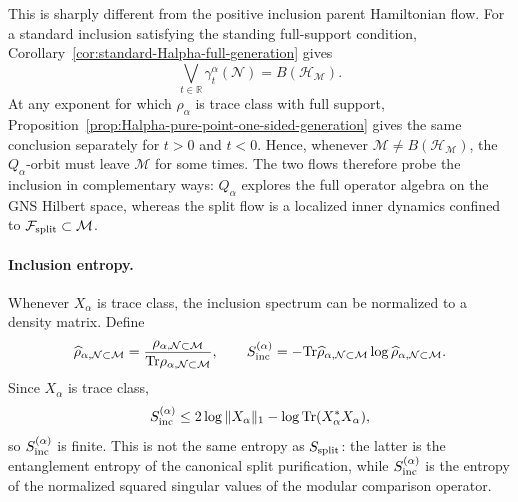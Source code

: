 \documentclass[a4paper,11pt]{article}
\theoremstyle{definition}
\newcommand{\Tr}{\text{Tr}}
\newcommand{\mN}{\mathcal{N}}
\newcommand{\mH}{\mathcal{H}}
\newcommand{\mM}{\mathcal{M}}
\begin{document}
This is sharply different from the positive inclusion parent Hamiltonian flow. For
a standard inclusion satisfying the standing full-support condition, Corollary~\ref{cor:standard-Halpha-full-generation}
gives
\begin{equation}
    \bigvee_{t\in\mathbb R}
    \gamma_t^\alpha(\mN)
    =B(\mH_{\mM}).
    \label{eq:Hinc-does-not-preserve-N}
\end{equation}
At any exponent for which $\rho_\alpha$ is trace class with full support,
Proposition~\ref{prop:Halpha-pure-point-one-sided-generation} gives the same
conclusion separately for $t>0$ and $t<0$.
Hence, whenever $\mM\neq B(\mH_{\mM})$, the $Q_\alpha$-orbit must
leave $\mM$ for some times. The two flows therefore probe the inclusion
in complementary ways: $Q_\alpha$ explores the full operator algebra on the
GNS Hilbert space, whereas the split flow is a localized inner dynamics
confined to $\mathcal F_{\rm split}\subset\mM$.

\paragraph{Inclusion entropy.}
Whenever $X_\alpha$ is trace class, the inclusion spectrum can be normalized to a density matrix. Define
\begin{equation}
    \widehat\rho_{\alpha,\mN\subset\mM}
    =\frac{\rho_{\alpha,\mN\subset\mM}}
           {\Tr\rho_{\alpha,\mN\subset\mM}},
    \qquad
    S_{\rm inc}^{(\alpha)}
    =-\Tr\widehat\rho_{\alpha,\mN\subset\mM}
          \log\widehat\rho_{\alpha,\mN\subset\mM}.
    \label{eq:rho-inclusion-normalized}
\end{equation}
Since $X_\alpha$ is trace class,
\begin{equation}
    S_{\rm inc}^{(\alpha)}
    \le
    2\log\|X_\alpha\|_1
    -\log\Tr(X_\alpha^*X_\alpha),
    \label{eq:Sinclusion-nuclearity-bound}
\end{equation}
so $S_{\rm inc}^{(\alpha)}$ is finite. This is not the same entropy as
$S_{\rm split}$: the latter is the entanglement entropy of the canonical split
purification, while $S_{\rm inc}^{(\alpha)}$ is the entropy of the normalized
squared singular values of the modular comparison operator.
\end{document}
